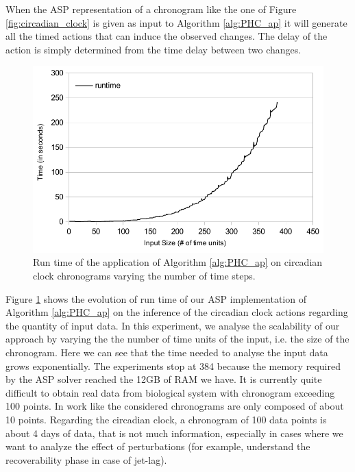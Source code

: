 When the ASP representation of a chronogram like the one of Figure \ref{fig:circadian_clock} is given as input to Algorithm \ref{alg:PHC_ap} it will generate all the timed actions that can induce the observed changes.
The delay of the action is simply determined from the time delay between two changes.

\begin{figure}[htb!]
\begin{center}
\includegraphics[width=0.5\linewidth]{images/circadian_run_time}
\end{center}
\caption{Run time of the application of Algorithm \ref{alg:PHC_ap} on circadian clock chronograms varying the number of time steps.}
\label{fig:run_time}
\end{figure}

Figure \ref{fig:run_time} shows the evolution of run time of our ASP implementation of Algorithm \ref{alg:PHC_ap} on the inference of the circadian clock actions regarding the quantity of input data.
In this experiment, we analyse the scalability of our approach by varying the the number of time units of the input, i.e. the size of the chronogram.
Here we can see that the time needed to analyse the input data grows exponentially.
The experiments stop at 384 because the memory required by the ASP solver reached the 12GB of RAM we have.
It is currently quite difficult to obtain real data from biological system with chronogram exceeding 100 points.
In work like \cite{Fippo14} the considered chronograms are only composed of about 10 points.
Regarding the circadian clock, a chronogram of 100 data points is about 4 days of data, that is not much information, especially in cases where we want to analyze the effect of perturbations (for example, understand the recoverability phase in case of jet-lag). 
